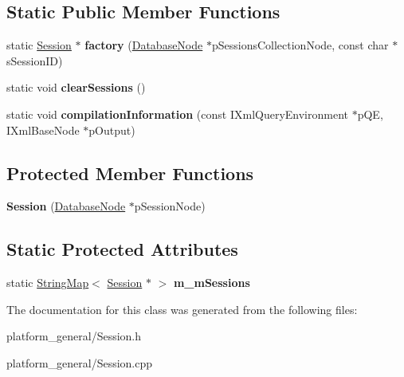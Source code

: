 \subsection*{\-Static \-Public \-Member \-Functions}
\begin{DoxyCompactItemize}
\item 
\hypertarget{classgeneral__server_1_1Session_aefb25ae635f8d48d8c2f4deabdb09d6d}{static \hyperlink{classgeneral__server_1_1Session}{\-Session} $\ast$ {\bfseries factory} (\hyperlink{classgeneral__server_1_1DatabaseNode}{\-Database\-Node} $\ast$p\-Sessions\-Collection\-Node, const char $\ast$s\-Session\-I\-D)}\label{classgeneral__server_1_1Session_aefb25ae635f8d48d8c2f4deabdb09d6d}

\item 
\hypertarget{classgeneral__server_1_1Session_a25d8a0ab375122adf432826051136d7e}{static void {\bfseries clear\-Sessions} ()}\label{classgeneral__server_1_1Session_a25d8a0ab375122adf432826051136d7e}

\item 
\hypertarget{classgeneral__server_1_1Session_ab1a845390e683da2a05f88c13fc460f5}{static void {\bfseries compilation\-Information} (const \-I\-Xml\-Query\-Environment $\ast$p\-Q\-E, \-I\-Xml\-Base\-Node $\ast$p\-Output)}\label{classgeneral__server_1_1Session_ab1a845390e683da2a05f88c13fc460f5}

\end{DoxyCompactItemize}
\subsection*{\-Protected \-Member \-Functions}
\begin{DoxyCompactItemize}
\item 
\hypertarget{classgeneral__server_1_1Session_a24a2d2bfacaab53d87c71a39c6c9a997}{{\bfseries \-Session} (\hyperlink{classgeneral__server_1_1DatabaseNode}{\-Database\-Node} $\ast$p\-Session\-Node)}\label{classgeneral__server_1_1Session_a24a2d2bfacaab53d87c71a39c6c9a997}

\end{DoxyCompactItemize}
\subsection*{\-Static \-Protected \-Attributes}
\begin{DoxyCompactItemize}
\item 
\hypertarget{classgeneral__server_1_1Session_aa588488adb6c9ca65a497cdac360ea0a}{static \hyperlink{classgeneral__server_1_1StringMap}{\-String\-Map}$<$ \hyperlink{classgeneral__server_1_1Session}{\-Session} $\ast$ $>$ {\bfseries m\-\_\-m\-Sessions}}\label{classgeneral__server_1_1Session_aa588488adb6c9ca65a497cdac360ea0a}

\end{DoxyCompactItemize}


\-The documentation for this class was generated from the following files\-:\begin{DoxyCompactItemize}
\item 
platform\-\_\-general/\-Session.\-h\item 
platform\-\_\-general/\-Session.\-cpp\end{DoxyCompactItemize}
